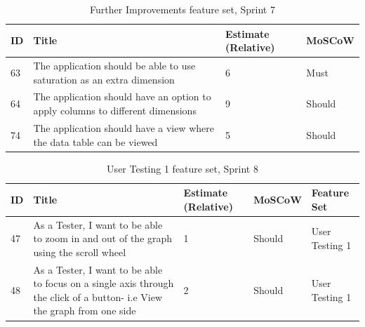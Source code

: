 \begin{table}[hbt!]
    \begin{tabularx}{\textwidth}{ | X | X | X | X | }
        \hline
        ID & Title                                                                          & Estimate (Relative) & MoSCoW \\
        \hline
        63 & The application should be able to use saturation as an extra dimension         & 6                   & Must   \\
        \hline
        64 & The application should have an option to apply columns to different dimensions & 9                   & Should \\
        \hline
        74 & The application should have a view where the data table can be viewed          & 5                   & Should \\
        \hline
    \end{tabularx}
    \caption{Further Improvements feature set, Sprint 7}
    \label{sprint7-2}
\end{table}

\begin{table}[hbt!]
    \begin{tabularx}{\textwidth}{ | X | X | X | X | X | }
        \hline
        ID & Title                                                                                                                    & Estimate (Relative) & MoSCoW & Feature Set    \\
        \hline
        47 & As a Tester, I want to be able to zoom in and out of the graph using the scroll wheel                                    & 1                   & Should & User Testing 1 \\
        \hline
        48 & As a Tester, I want to be able to focus on a single axis through the click of a button- i.e View the graph from one side & 2                   & Should & User Testing 1 \\
        \hline
    \end{tabularx}
    \caption{User Testing 1 feature set, Sprint 8}
    \label{sprint8}
\end{table}

